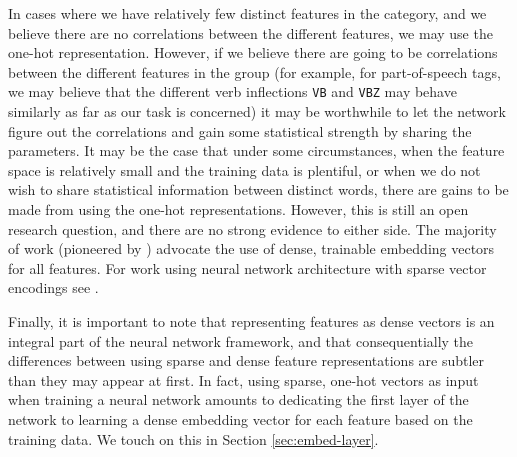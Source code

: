 \documentclass[jair,twoside,11pt,theapa]{article}
\begin{document}
{In cases where we have relatively few distinct features in the category, and we
believe there are no correlations between the different features, we may use the
one-hot representation. However, if we believe there are going to be correlations
between the different features in the group (for example, for part-of-speech
tags, we may believe that the different verb inflections \texttt{VB} and
\texttt{VBZ} may
behave similarly as far as our task is concerned) it may be worthwhile to let
the network figure out the correlations and gain some statistical strength by
sharing the parameters.
It may be the case that under some circumstances, when
the feature space is relatively small and the training data is plentiful, or
when we do not wish to share statistical information between distinct words, there
are gains to be made from using the one-hot representations. However, this is
still an open research question, and there are no strong evidence to either side.
The majority of work (pioneered by
\cite{collobert2008unified,collobert2011natural,chen2014fast})
advocate the use of dense, trainable embedding vectors for all features.
For work using neural network architecture with sparse vector encodings see
\cite{johnson2015effective}.

Finally, it is important to note that representing features as dense vectors
is an integral part of the neural network framework, and that consequentially 
the differences between using sparse and dense feature representations are
subtler than they may appear at first.  In fact, using sparse, one-hot vectors
as input when training a neural network amounts to dedicating the first layer
of the network to learning a dense embedding vector for each feature 
based on the training data.  We touch on this in Section \ref{sec:embed-layer}.

}
\end{document}
